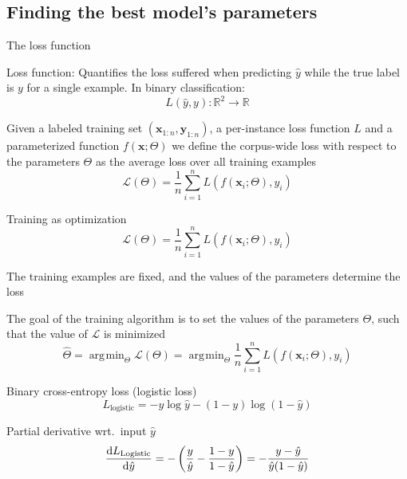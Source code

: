 \documentclass[12pt,aspectratio=169,handout]{beamer}
\DeclareMathOperator*{\argmin}{arg\!\min}
\begin{document}
\subsection{Finding the best model's parameters}

\begin{frame}{The loss function}
	
Loss function: Quantifies the loss suffered when predicting $\hat{y}$ while the true label is $y$ for a single example. In binary classification:
$$
L(\hat{y}, y): \mathbb{R}^2 \to \mathbb{R}
$$


Given a labeled training set 
$(\bm{x}_{1:n}, \bm{y}_{1:n})$, 
a per-instance loss function $L$ and a
parameterized function $f(\bm{x}; \Theta)$ we define the corpus-wide loss with respect to the parameters $\Theta$ as the average loss over all training examples
$$
\mathcal{L}(\Theta) = \frac{1}{n} \sum_{i =1}^{n} L (f(\bm{x}_i; \Theta), y_i)
$$
\end{frame}

\begin{frame}{Training as optimization}
$$
\mathcal{L}(\Theta) = \frac{1}{n} \sum_{i =1}^{n} L (f(\bm{x}_i; \Theta), y_i)
$$

The training examples are fixed, and the values of the parameters determine the loss

The goal of the training algorithm is to set the values of the parameters $\Theta$‚ such that
the value of $\mathcal{L}$ is minimized
$$
\hat{\Theta} = \argmin_{\Theta} \mathcal{L}(\Theta) = \argmin_{\Theta} \frac{1}{n} \sum_{i =1}^{n} L (f(\bm{x}_i; \Theta), y_i)
$$


\end{frame}

\begin{frame}{Binary cross-entropy loss (logistic loss)}
$$
L_{\text{logistic}} = - y \log \hat{y} - (1 - y) \log (1 - \hat{y})
$$

\begin{block}{Partial derivative wrt.\ input $\hat{y}$}
$$
\dv{L_{\text{Logistic}}}{\hat{y}} =
- \left(
\frac{y}{\hat{y}} - \frac{1 - y}{1 - \hat{y}}
\right)
=
- \frac{y - \hat{y}}{ \hat{y} (1 - \hat{y})}
$$
\end{block}

\end{frame}
\end{document}
